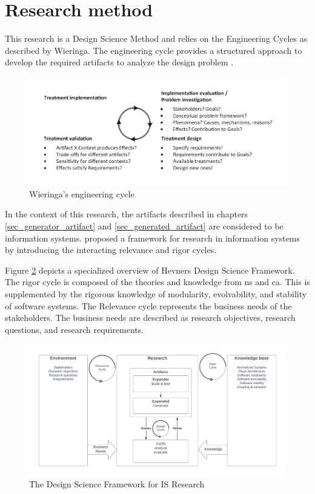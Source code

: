 \section{Research method} \label{sec_research_method}

This research is a Design Science Method and relies on the Engineering Cycles as described
by Wieringa. The engineering cycle provides a structured approach to develop the
required artifacts to analyze the design problem \parencite{wieringa_design_2014}.

\begin{figure}[H]
    \centering
    \includegraphics[width=1\textwidth]{Figures/engineering_cycle.pdf}
    \caption[Engineering cycle]{Wieringa's engineering cycle}
    \label{fig_engineering_cycle}
\end{figure}

In the context of this research, the artifacts described in chapters
\ref{sec_generator_artifact} and \ref{sec_generated_artifact} are considered to be
information systems. \citeauthor{hevner_design_nodate} proposed a framework for research
in information systems by introducing the interacting relevance and rigor cycles.

Figure \ref{fig_dsr} depicts a specialized overview of Hevners Design Science Framework.
The rigor cycle is composed of the theories and knowledge from \gls{ns}
and \gls{ca}. This is supplemented by the rigorous knowledge of modularity,
evolvability, and stability of software systems. The Relevance cycle represents the
business needs of the stakeholders. The business needs are described as research
objectives, research questions, and research requirements.

\begin{figure}[H]
    \centering
    \includegraphics[width=1\textwidth]{Figures/rigor_relevance_cycle.pdf}
    \caption[DSF]{The Design Science Framework for IS Research}
    \label{fig_dsr}
\end{figure}